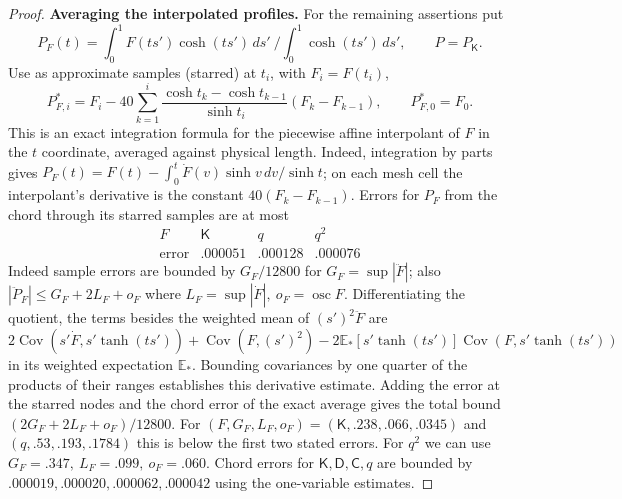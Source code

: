 \begin{proof}
\smallskip
\noindent\textbf{Averaging the interpolated profiles.}\quad
For the remaining assertions put
\[
 P_F(t)=\int_0^1 F(ts')\cosh(ts')\,ds'\ \Big/\int_0^1\cosh(ts')\,ds',
 \qquad P=P_{\mathsf K}.
\]
Use as approximate samples (starred) at \(t_i\), with \(F_i=F(t_i)\),
\[
 P_{F,i}^*=F_i-40\sum_{k=1}^i\frac{\cosh t_k-\cosh t_{k-1}}{\sinh t_i}(F_k-F_{k-1}),
 \qquad P_{F,0}^*=F_0.
\]
This is an exact integration formula for the piecewise affine interpolant
of $F$ in the $t$ coordinate, averaged against physical length. Indeed,
integration by parts gives
$P_F(t)=F(t)-\int_0^t\dot F(v)\sinh v\,dv/\sinh t$;
on each mesh cell the interpolant's derivative is the constant
$40(F_k-F_{k-1})$. Errors for \(P_F\) from the chord through its starred samples are at most
\[
\begin{array}{c|ccc}
 F&\mathsf K&q&q^2\\\hline
 \text{error}&.000051&.000128&.000076
\end{array}
\]
Indeed sample errors are bounded by \(G_F/12800\) for \(G_F=\sup |\ddot F|\); also
\(|\ddot P_F|\le G_F+2L_F+o_F\) where \(L_F=\sup|\dot F|,\ o_F=\operatorname{osc} F\). Differentiating the quotient, the terms besides the weighted mean of \((s')^2\ddot F\) are
\(2\operatorname{Cov}(s'\dot F,s'\tanh(ts'))+\operatorname{Cov}(F,(s')^2)
-2\mathbb E_*[s'\tanh(ts')]\operatorname{Cov}(F,s'\tanh(ts'))\)
in its weighted expectation \(\mathbb E_*\). Bounding covariances by one quarter of the products of their ranges
establishes this derivative estimate. Adding the error at the starred
nodes and the chord error of the exact average gives the total bound
$(2G_F+2L_F+o_F)/12800$.
For $(F,G_F,L_F,o_F)=(\mathsf K,.238,.066,.0345)$ and
$(q,.53,.193,.1784)$ this is below the first two stated errors.
For $q^2$ we can use \(G_F=.347,\ L_F=.099,\ o_F=.060\).
Chord errors for \(\mathsf K,\mathsf D,\mathsf C,q\) are bounded by \(.000019,.000020,.000062,.000042\) using the one-variable estimates.


\end{proof}
